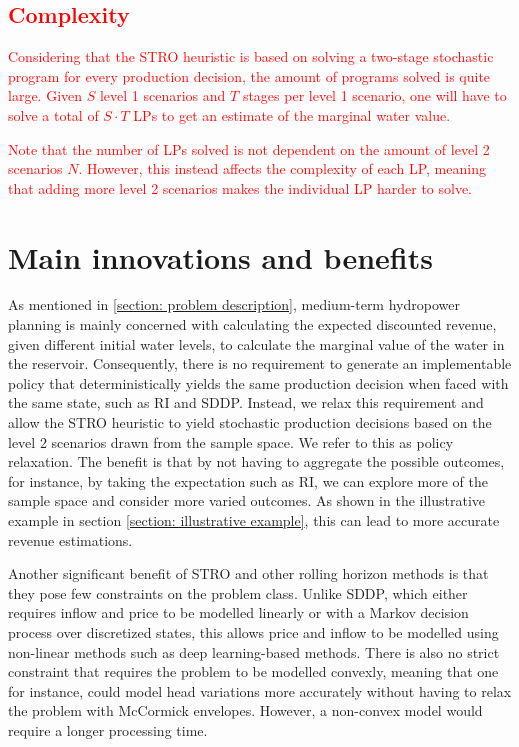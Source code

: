 \textcolor{red}{
\section*{Complexity}
Considering that the STRO heuristic is based on solving a two-stage stochastic program for every production decision, the amount of programs solved is quite large. Given $S$ level 1 scenarios and $T$ stages per level 1 scenario, one will have to solve a total of $ S \cdot T$ LPs to get an estimate of the marginal water value. 
}

\textcolor{red}{
Note that the number of LPs solved is not dependent on the amount of level 2 scenarios $N$. However, this instead affects the complexity of each LP, meaning that adding more level 2 scenarios makes the individual LP harder to solve.  
}

\section*{Main innovations and benefits}
As mentioned in \ref{section: problem description}, medium-term hydropower planning is mainly concerned with calculating the expected discounted revenue, given different initial water levels, to calculate the marginal value of the water in the reservoir. Consequently, there is no requirement to generate an implementable policy that deterministically yields the same production decision when faced with the same state, such as RI and SDDP. Instead, we relax this requirement and allow the STRO heuristic to yield stochastic production decisions based on the level 2 scenarios drawn from the sample space. We refer to this as policy relaxation. The benefit is that by not having to aggregate the possible outcomes, for instance, by taking the expectation such as RI, we can explore more of the sample space and consider more varied outcomes. As shown in the illustrative example in section \ref{section: illustrative example}, this can lead to more accurate revenue estimations. 

Another significant benefit of STRO and other rolling horizon methods is that they pose few constraints on the problem class. Unlike SDDP, which either requires inflow and price to be modelled linearly or with a Markov decision process over discretized states, this allows price and inflow to be modelled using non-linear methods such as deep learning-based methods. There is also no strict constraint that requires the problem to be modelled convexly, meaning that one for instance, could model head variations more accurately without having to relax the problem with McCormick envelopes. However, a non-convex model would require a longer processing time.  

